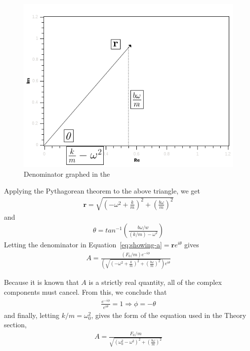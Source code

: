 \documentclass[twocolumn,english]{IEEEtran}
\theoremstyle{plain}
\theoremstyle{plain}
\begin{document}
  \begin{figure}[h!]
  \begin{centering}
  \begin{center}
  \includegraphics[width=\linewidth]{./real_im.png}
  \caption{Denominator graphed in the }
  \label{fig:real_im}
  \end{center}
  \par\end{centering}
  \end{figure}

  Applying the Pythagorean theorem to the above triangle, we get
  \begin{align*}
   \mathbf{r} = \sqrt{(-\omega^2 + \frac{k}{m})^2 + (\frac{b\omega}{m})^2}
  \end{align*}
  and
  \begin{align*}
   \theta = tan^{-1}\left( \frac{b\omega/w}{(k/m) - \omega^2}\right)
  \end{align*}
  Letting the denominator in Equation~\ref{eq:showing-a}$= \mathbf{r}e^{i\theta}$ gives
  \begin{align*}
   A = \frac{(F_0/m)e^{-i\phi}}{\left(\sqrt{(-\omega^2 + \frac{k}{m})^2 + (\frac{b\omega}{m})^2}\right)e^{i\theta}}
  \end{align*}

  Because it is known that $A$ is a strictly real quantity, all of the complex components must cancel. From this, we conclude that
  \begin{align*}
   \frac{e^{-i\phi}}{e^{i\theta}} = 1 \Rightarrow \phi = -\theta
  \end{align*}
  and finally, letting $k/m = \omega_0^2$, gives the form of the equation used in the Theory section,
  \begin{align*}
   A = \frac{F_0/m}{\sqrt{(\omega_0^2 - \omega^2)^2 + (\frac{b\omega}{m})^2}}
  \end{align*}

%
%
\end{document}
